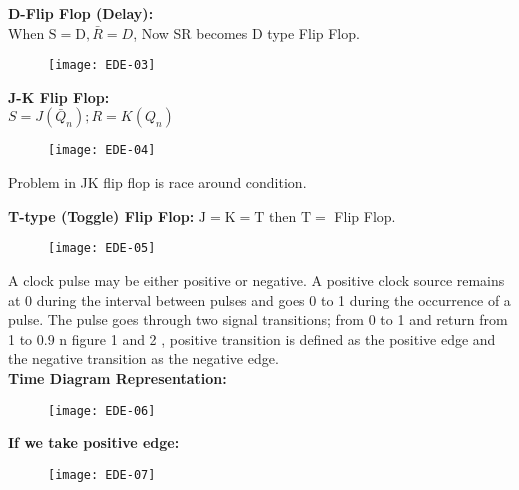 \textbf {D-Flip Flop (Delay): }\\
When $\mathrm{S}=\mathrm{D}, \bar{R}=D$, Now SR becomes $\mathrm{D}$ type Flip Flop.
\begin{figure}[H]
	\centering
	\texttt{[image: EDE-03]}
\end{figure}
\textbf { J-K Flip Flop: }\\
$S=J\left(\bar{Q}_{n}\right) ; R=K\left(Q_{n}\right)$
\begin{figure}[H]
	\centering
	\texttt{[image: EDE-04]}
\end{figure}
\begin{note}
Problem in JK flip flop is race around condition.
\end{note}
 \textbf{T-type (Toggle) Flip Flop:} $\mathrm{J}=\mathrm{K}=\mathrm{T}$ then $\mathrm{T}=$ Flip Flop.
 \begin{figure}[H]
 	\centering
 	\texttt{[image: EDE-05]}
 \end{figure}
 A clock pulse may be either positive or negative. A positive clock source remains at 0 during the interval between pulses and goes 0 to 1 during the occurrence of a pulse. The pulse goes through two signal transitions; from 0 to 1 and return from 1 to $0.9$ n figure 1 and 2 , positive transition is defined as the positive edge and the negative transition as the negative edge.\\
 \textbf{Time Diagram Representation:}
 \begin{figure}[H]
 	\centering
 	\texttt{[image: EDE-06]}
 \end{figure}
 \textbf{If we take positive edge:}
 \begin{figure}[H]
 	\centering
 	\texttt{[image: EDE-07]}
 \end{figure}
